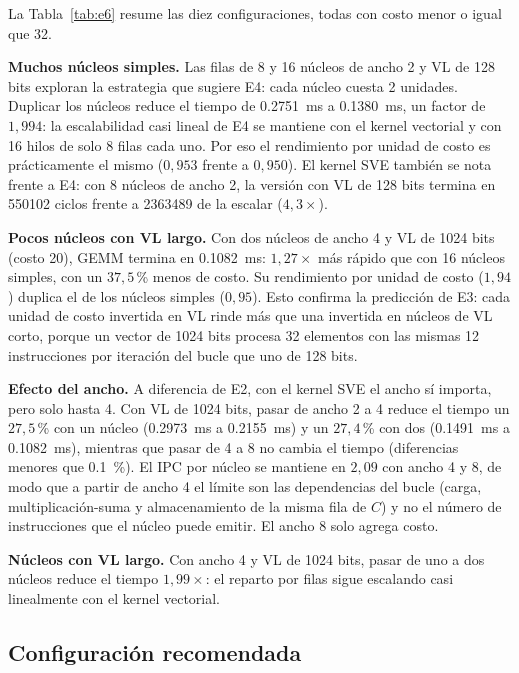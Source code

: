 \documentclass[journal]{IEEEtran}
\begin{document}
La Tabla~\ref{tab:e6} resume las diez configuraciones, todas con costo
menor o igual que 32.

\textbf{Muchos núcleos simples.} Las filas de 8 y 16 núcleos de ancho 2
y VL de 128 bits exploran la estrategia que sugiere E4: cada núcleo
cuesta 2 unidades. Duplicar los núcleos reduce el tiempo de
\SI{0,2751}{ms} a \SI{0,1380}{ms}, un factor de $1{,}994$: la
escalabilidad casi lineal de E4 se mantiene con el kernel vectorial y
con 16 hilos de solo 8 filas cada uno. Por eso el rendimiento por unidad
de costo es prácticamente el mismo ($0{,}953$ frente a $0{,}950$). El
kernel SVE también se nota frente a E4: con 8 núcleos de ancho 2, la
versión con VL de 128 bits termina en \num{550102} ciclos frente a
\num{2363489} de la escalar ($4{,}3\times$).

\textbf{Pocos núcleos con VL largo.} Con dos núcleos de ancho 4 y VL de
1024 bits (costo 20), GEMM termina en \SI{0,1082}{ms}: $1{,}27\times$ más rápido que con 16
núcleos simples, con un $37{,}5$\,\% menos de costo. Su rendimiento por unidad de costo
($1{,}94$) duplica el de los núcleos simples ($0{,}95$). Esto confirma
la predicción de E3: cada unidad de costo invertida en VL rinde más que
una invertida en núcleos de VL corto, porque un vector de 1024 bits
procesa 32 elementos con las mismas 12 instrucciones por iteración
del bucle que uno de 128 bits.

\textbf{Efecto del ancho.} A diferencia de E2, con el kernel SVE el
ancho sí importa, pero solo hasta 4. Con VL de 1024 bits, pasar de
ancho 2 a 4 reduce el tiempo un $27{,}5$\,\% con un núcleo
(\SI{0,2973}{ms} a \SI{0,2155}{ms}) y un $27{,}4$\,\% con dos
(\SI{0,1491}{ms} a \SI{0,1082}{ms}), mientras que pasar de 4 a 8 no
cambia el tiempo (diferencias menores que \SI{0,1}{\percent}). El IPC
por núcleo se mantiene en $2{,}09$ con ancho 4 y 8, de modo que a
partir de ancho 4 el límite son las dependencias del bucle (carga,
multiplicación-suma y almacenamiento de la misma fila de $C$) y no el
número de instrucciones que el núcleo puede emitir. El ancho 8 solo
agrega costo.

\textbf{Núcleos con VL largo.} Con ancho 4 y VL de 1024 bits, pasar de
uno a dos núcleos reduce el tiempo $1{,}99\times$: el reparto por filas
sigue escalando casi linealmente con el kernel vectorial.

\subsection{Configuración recomendada}
\end{document}
